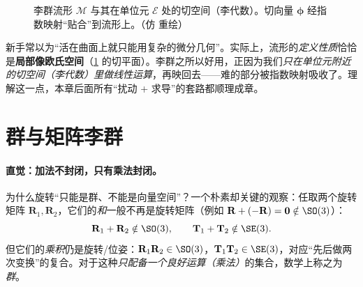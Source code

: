 \begin{figure}[ht]
\centering
{}
\caption{李群流形 $\mathcal{M}$ 与其在单位元 $\mathcal{E}$ 处的切空间（李代数）。切向量 $\boldsymbol{\phi}$ 经指数映射“贴合”到流形上。（仿 \cite{barfoot2024state} 重绘）}
\label{fig:lie-manifold}
\end{figure}

\begin{pitfall}[概念误区：“流形 = 弯曲，所以一定难算”]
新手常以为“活在曲面上就只能用复杂的微分几何”。实际上，流形的\emph{定义性质}恰恰是\textbf{局部像欧氏空间}（\cref{fig:lie-manifold} 的切平面）。李群之所以好用，正因为我们\emph{只在单位元附近的切空间（李代数）里做线性运算}，再映回去——难的部分被指数映射吸收了。理解这一点，本章后面所有“扰动 + 求导”的套路都顺理成章。
\end{pitfall}

\section{群与矩阵李群}
\label{sec:group}

\paragraph{直觉：加法不封闭，只有乘法封闭。}
为什么旋转“只能是群、不能是向量空间”？一个朴素却关键的观察\cite{gaoxiang2019slam14}：任取两个旋转矩阵 $\mathbf{R}_1,\mathbf{R}_2$，它们的\emph{和}一般不再是旋转矩阵（例如 $\mathbf{R}+(-\mathbf{R})=\mathbf{0}\notin\SO(3)$）：
\begin{equation}
  \mathbf{R}_1+\mathbf{R}_2\notin\SO(3),\qquad \mathbf{T}_1+\mathbf{T}_2\notin\SE(3).
  \label{eq:not-vs}
\end{equation}
但它们的\emph{乘积}仍是旋转/位姿：$\mathbf{R}_1\mathbf{R}_2\in\SO(3)$，$\mathbf{T}_1\mathbf{T}_2\in\SE(3)$，对应“先后做两次变换”的复合。对于这种\emph{只配备一个良好运算（乘法）}的集合，数学上称之为\emph{群}。

